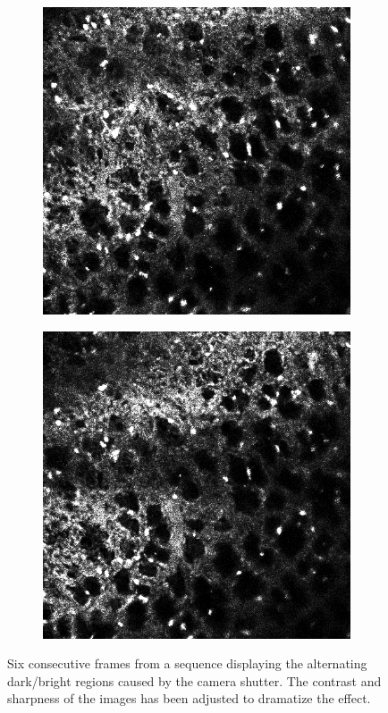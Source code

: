 \begin{figure}[h]
\begin{subfigure}{.32\textwidth}
		\end{subfigure}%
		\hfill
		\begin{subfigure}{.32\textwidth}
		\includegraphics[width=\textwidth]{images/shutterseriesm170_13cropped005}
		\end{subfigure}%
		\hfill
		\begin{subfigure}{.32\textwidth}
		\includegraphics[width=\textwidth]{images/shutterseriesm170_13cropped006}
		\end{subfigure}
		\caption{Six consecutive frames from a sequence displaying the alternating dark/bright regions caused by the camera shutter. The contrast and sharpness of the images has been adjusted to dramatize the effect.}
		\label{fig:data_challenge_shutter}
	\end{figure}
	
